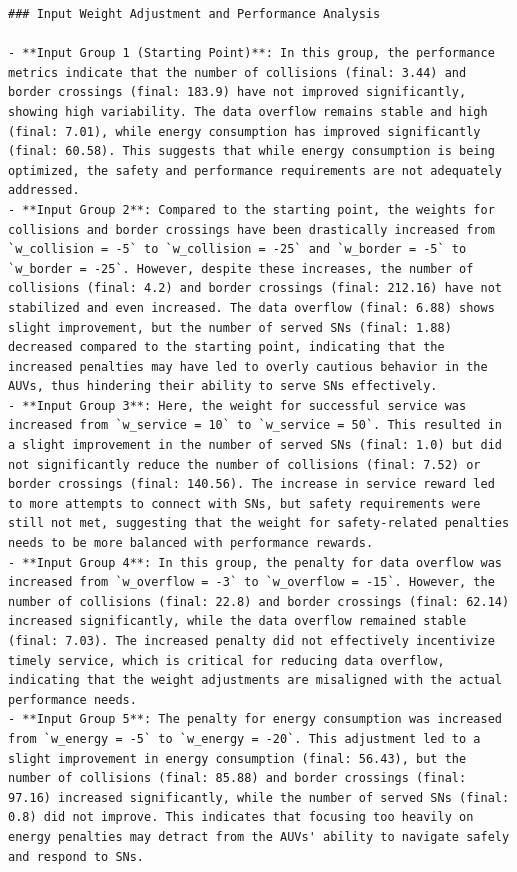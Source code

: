 \documentclass{article}
\begin{document}
\begin{verbatim}
### Input Weight Adjustment and Performance Analysis

- **Input Group 1 (Starting Point)**: In this group, the performance metrics indicate that the number of collisions (final: 3.44) and border crossings (final: 183.9) have not improved significantly, showing high variability. The data overflow remains stable and high (final: 7.01), while energy consumption has improved significantly (final: 60.58). This suggests that while energy consumption is being optimized, the safety and performance requirements are not adequately addressed.
- **Input Group 2**: Compared to the starting point, the weights for collisions and border crossings have been drastically increased from `w_collision = -5` to `w_collision = -25` and `w_border = -5` to `w_border = -25`. However, despite these increases, the number of collisions (final: 4.2) and border crossings (final: 212.16) have not stabilized and even increased. The data overflow (final: 6.88) shows slight improvement, but the number of served SNs (final: 1.88) decreased compared to the starting point, indicating that the increased penalties may have led to overly cautious behavior in the AUVs, thus hindering their ability to serve SNs effectively.
- **Input Group 3**: Here, the weight for successful service was increased from `w_service = 10` to `w_service = 50`. This resulted in a slight improvement in the number of served SNs (final: 1.0) but did not significantly reduce the number of collisions (final: 7.52) or border crossings (final: 140.56). The increase in service reward led to more attempts to connect with SNs, but safety requirements were still not met, suggesting that the weight for safety-related penalties needs to be more balanced with performance rewards.
- **Input Group 4**: In this group, the penalty for data overflow was increased from `w_overflow = -3` to `w_overflow = -15`. However, the number of collisions (final: 22.8) and border crossings (final: 62.14) increased significantly, while the data overflow remained stable (final: 7.03). The increased penalty did not effectively incentivize timely service, which is critical for reducing data overflow, indicating that the weight adjustments are misaligned with the actual performance needs.
- **Input Group 5**: The penalty for energy consumption was increased from `w_energy = -5` to `w_energy = -20`. This adjustment led to a slight improvement in energy consumption (final: 56.43), but the number of collisions (final: 85.88) and border crossings (final: 97.16) increased significantly, while the number of served SNs (final: 0.8) did not improve. This indicates that focusing too heavily on energy penalties may detract from the AUVs' ability to navigate safely and respond to SNs.


\end{verbatim}
\end{document}
